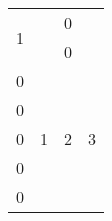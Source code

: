 \documentclass[a4paper,14pt]{extreport}
\begin{document}
	\bigskip
	
	\begin{tabular}{|c|c|c|c|} \hline
		\multirow{2}{*}{1} & \multicolumn{3}{|c|}{0} \\ \cline{2-4}
		& \multicolumn{3}{|c|}{0} \\ \hline
		0 & \multirow{5}{*}{1} & \multirow{5}{*}{2} & \multirow{5}{*}{3} \\ \cline{1-1}
		0 & & & \\ \cline{1-1}
		0 & & & \\ \cline{1-1}
		0 & & & \\ \cline{1-1}
		0 & & & \\ \hline
	\end{tabular}
\end{document}
